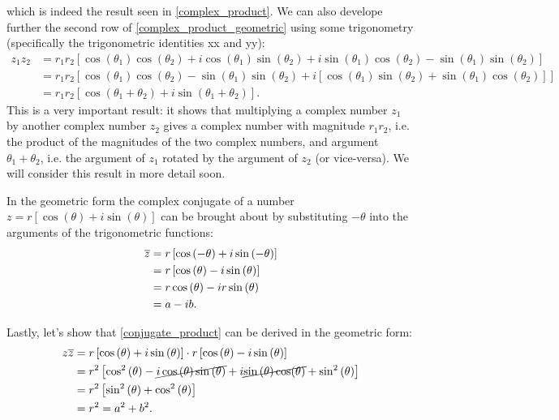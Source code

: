 which is indeed the result seen in \eqref{complex_product}. We can also develope further the second row of \eqref{complex_product_geometric} using some trigonometry (specifically the trigonometric identities xx and yy):
\begin{align}
	z_{1}z_{2} &= r_{1}r_{2}\left[ \cos\left( \theta_{1} \right)\cos\left( \theta_{2} \right) + i\cos\left( \theta_{1} \right)\sin\left( \theta_{2} \right) + i\sin\left( \theta_{1} \right)\cos\left( \theta_{2} \right) -\sin\left( \theta_{1} \right)\sin\left( \theta_{2} \right) \right]\nonumber\\
	&= r_{1}r_{2}\left[ \cos\left( \theta_{1} \right)\cos\left( \theta_{2} \right)-\sin\left( \theta_{1} \right)\sin\left( \theta_{2} \right) + i\left[ \cos\left( \theta_{1} \right)\sin\left( \theta_{2} \right) + \sin\left( \theta_{1} \right)\cos\left( \theta_{2} \right) \right] \right]\nonumber\\
	&= r_{1}r_{2}\left[ \cos\left( \theta_{1}+\theta_{2} \right) + i\sin\left( \theta_{1}+\theta_{2} \right)  \right].
	\label{eq:complex_product_geometric_insight}
\end{align}
This is a very important result: it shows that multiplying a complex number $z_{1}$ by another complex number $z_{2}$ gives a complex number with magnitude $r_{1}r_{2}$, i.e. the product of the magnitudes of the two complex numbers, and argument $\theta_{1}+\theta_{2}$, i.e. the argument of $z_{1}$ rotated by the argument of $z_{2}$ (or vice-versa). We will consider this result in more detail soon.


In the geometric form the complex conjugate of a number $z=r\left[ \cos\left( \theta \right) +i\sin\left( \theta \right) \right]$ can be brought about by substituting $-\theta$ into the arguments of the trigonometric functions:
\begin{align}
	\overline{z} &= r\left[ \cos\left( -\theta \right) + i\sin\left( -\theta \right) \right]\nonumber\\
	&= r\left[ \cos\left( \theta \right) - i\sin\left( \theta \right) \right]\nonumber\\
	&= r\cos\left( \theta \right) - ir\sin\left( \theta \right)\nonumber\\
	&= a-ib.
	\label{eq:complex_conjugation_geometric}
\end{align}

Lastly, let's show that \eqref{conjugate_product} can be derived in the geometric form:
\begin{align}
	z\overline{z} &= r\left[ \cos\left( \theta \right) + i\sin\left( \theta \right) \right] \cdot r\left[ \cos\left( \theta \right) - i\sin\left( \theta \right) \right]\nonumber\\
	&= r^{2}\left[ \cos^{2}\left( \theta \right) -\cancel{i\cos\left( \theta \right)\sin\left( \theta \right)} +i\cancel{\sin\left( \theta \right)\cos(\theta)} + \sin^{2}\left( \theta \right) \right]\nonumber\\
	&= r^{2}\left[ \sin^{2}\left( \theta \right) + \cos^{2}\left( \theta \right) \right]\nonumber\\
	&= r^{2} = a^{2}+b^{2}.
	\label{eq:conjugate_product_geometric}
\end{align}

